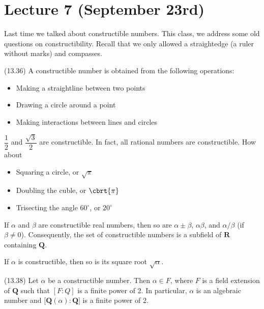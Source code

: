 \section{Lecture 7 (September 23rd)}
\begin{rmk}
Last time we talked about constructible numbers. This class, we address some old questions on constructibility. Recall that we only allowed a straightedge (a ruler without marks) and compasses. 
\end{rmk}
\vspace{2ex}
\begin{defi}
(13.36) A constructible number is obtained from the following operations: 
\begin{itemize}
\item[(i)] Making a straightline between two points
\item[(ii)] Drawing a circle around a point
\item[(iii)] Making interactions between lines and circles 
\end{itemize}
\end{defi}
\vspace{2ex}
\begin{ex}
$\dfrac{1}{2}$ and $\dfrac{\sqrt{3}}{2}$ are constructible. In fact, all rational numbers are constructible. How about
\begin{itemize}
\item[(i)] Squaring a circle, or $\sqrt{\pi }$
\item[(ii)] Doubling the cuble, or $\cbrt{\pi }$
\item[(iii)] Trisecting the angle $60^{\circ}$, or $20^{\circ}$
\end{itemize}
\end{ex}
\vspace{2ex}
\begin{rmk}
If $\alpha $ and $\beta $ are constructible real numbers, then so are $\alpha \pm \beta $, $\alpha \beta $, and $\alpha /\beta $ (if $\beta \ne 0$). Consequently, the set of constructible numbers is a subfield of ${\bm R}$ containing ${\bm Q}$.
\end{rmk}
\vspace{2ex}
\begin{rmk}
If $\alpha $ is constructible, then so is its square root $\sqrt{\alpha }$.
\end{rmk}
\vspace{2ex}
\begin{thm}
(13.38) Let $\alpha$ be a constructible number. Then $\alpha \in F$, where $F$ is a field extension of ${\bm Q}$ such that $[F:Q]$ is a finite power of 2. In particular, $\alpha $ is an algebraic number and $[{\bm Q}(\alpha ):{\bm Q]}$ is a finite power of 2.
\end{thm}
